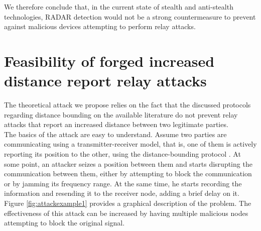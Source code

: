 \documentclass{article}
\begin{document}
We therefore conclude that, in the current state of stealth and anti-stealth technologies, RADAR detection would not be a strong countermeasure to prevent against malicious devices attempting to perform relay attacks.\\







































\section{Feasibility of forged increased distance report relay attacks}
\label{sec:attackfeasibility}

The theoretical attack we propose relies on the fact that the discussed protocols regarding distance bounding on the available literature do not prevent relay attacks that report an increased distance between two legitimate parties.\\

The basics of the attack are easy to understand. Assume two parties are communicating using a transmitter-receiver model, that is, one of them is actively reporting its position to the other, using the distance-bounding protocol \cite{rasmussen2010realization}. At some point, an attacker seizes a position between them and starts disrupting the communication between them, either by attempting to block the communication or by jamming its frequency range. At the same time, he starts recording the information and resending it to the receiver node, adding a brief delay on it. Figure \ref{fig:attackexample1} provides a graphical description of the problem. The effectiveness of this attack can be increased by having multiple malicious nodes attempting to block the original signal.\\
\end{document}
